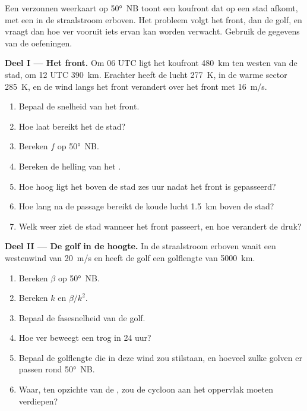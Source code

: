\begin{problem}\label{pb:b2:weather-systems:1}
Een verzonnen weerkaart op \ang{50}~NB toont een koufront dat op een stad afkomt, met een
 in de straalstroom erboven. Het probleem volgt het front, dan de golf, en vraagt dan hoe ver
vooruit iets ervan kan worden verwacht. Gebruik de gegevens van de oefeningen.

\medskip\noindent\textbf{Deel I --- Het front.}
Om 06 UTC ligt het koufront \qty{480}{km} ten westen van de stad, om 12 UTC \qty{390}{km}. Erachter
heeft de lucht \qty{277}{K}, in de warme sector \qty{285}{K}, en de wind langs het front
verandert over het front met \qty{16}{m/s}.
\begin{enumerate}
  \item Bepaal de snelheid van het front.
  \item Hoe laat bereikt het de stad?
  \item Bereken $f$ op \ang{50}~NB.
  \item Bereken de helling van het .
  \item Hoe hoog ligt het  boven de stad zes uur nadat het front is gepasseerd?
  \item Hoe lang na de passage bereikt de koude lucht \qty{1.5}{km} boven de stad?
  \item Welk weer ziet de stad wanneer het front passeert, en hoe verandert de druk?
\end{enumerate}

\medskip\noindent\textbf{Deel II --- De golf in de hoogte.}
In de straalstroom erboven waait een westenwind van \qty{20}{m/s} en heeft de golf een golflengte van \qty{5000}{km}.
\begin{enumerate}[resume]
  \item Bereken $\beta$ op \ang{50}~NB.
  \item Bereken $k$ en $\beta/k^2$.
  \item Bepaal de fasesnelheid van de golf.
  \item Hoe ver beweegt een trog in 24 uur?
  \item Bepaal de golflengte die in deze wind zou stilstaan, en hoeveel zulke golven er passen
        rond \ang{50}~NB.
  \item Waar, ten opzichte van de , zou de cycloon aan het oppervlak moeten verdiepen?
\end{enumerate}


\end{problem}
